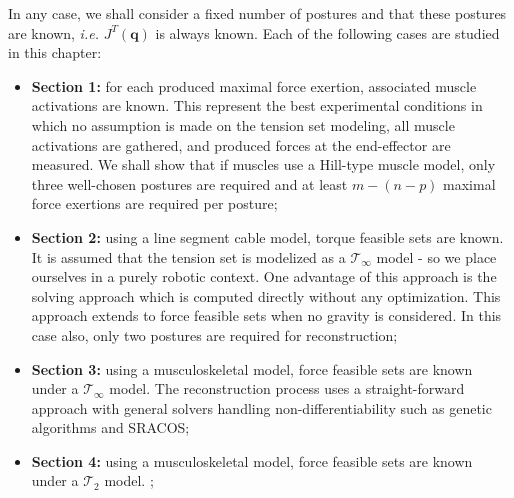 In any case, we shall consider a fixed number of postures and that these postures are known, \emph{i.e.} $J^T(\mathbf{q})$ is always known. Each of the following cases are studied in this chapter:
\begin{itemize}
    \item {\textbf{Section 1:} for each produced maximal force exertion, associated muscle activations are known. This represent the best experimental conditions in which no assumption is made on the tension set modeling, all muscle activations are gathered, and produced forces at the end-effector are measured. We shall show that if muscles use a Hill-type muscle model, only three well-chosen postures are required and at least $m-(n-p)$ maximal force exertions are required per posture;}
    \item {\textbf{Section 2:} using a line segment cable model, torque feasible sets are known. It is assumed that the tension set is modelized as a $\mathcal{T}_{\infty}$ model - so we place ourselves in a purely robotic context. One advantage of this approach is the solving approach which is computed directly without any optimization. This approach extends to force feasible sets when no gravity is considered. In this case also, only two postures are required for reconstruction; }
    \item {\textbf{Section 3:} using a musculoskeletal model, force feasible sets are known under a $\mathcal{T}_{\infty}$ model. The reconstruction process uses a straight-forward approach with general solvers handling non-differentiability such as genetic algorithms and SRACOS;}
    \item {\textbf{Section 4:} using a musculoskeletal model, force feasible sets are known under a $\mathcal{T}_2$ model. ;}
\end{itemize} 

